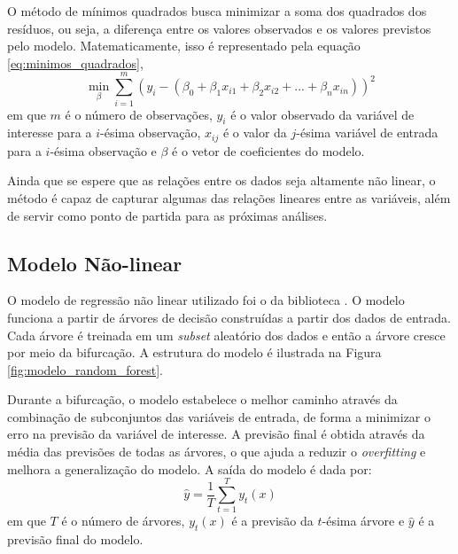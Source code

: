 O método de mínimos quadrados busca minimizar a soma dos quadrados dos resíduos, ou seja, a diferença entre os valores
observados e os valores previstos pelo modelo. Matematicamente, isso é representado pela equação \ref{eq:minimos_quadrados},
\begin{equation}
\label{eq:minimos_quadrados}
\min_{\beta} \sum_{i=1}^{m} \left(y_i - (\beta_0 + \beta_1 x_{i1} + \beta_2 x_{i2} + ... + \beta_n x_{in})\right)^2
\end{equation}
em que $m$ é o número de observações, $y_i$ é o valor observado da variável de interesse para a $i$-ésima observação,
$x_{ij}$ é o valor da $j$-ésima variável de entrada para a $i$-ésima observação e $\beta$ é o vetor de coeficientes
do modelo.

Ainda que se espere que as relações entre os dados seja altamente não linear, o método é capaz de capturar algumas
das relações lineares entre as variáveis, além de servir como ponto de partida para as próximas análises.


\subsection{Modelo Não-linear}
O modelo de regressão não linear utilizado foi o  da biblioteca . O modelo 
funciona a partir de árvores de decisão construídas a partir dos dados de entrada. Cada árvore é treinada em um \textit{subset}
aleatório dos dados e então a árvore cresce por meio da bifurcação. A estrutura do modelo é ilustrada na Figura
\ref{fig:modelo_random_forest}.

\begin{figure}[!ht]
	{}
	{}
\end{figure}
Durante a bifurcação, o modelo estabelece o melhor caminho através da combinação de subconjuntos das variáveis de entrada, 
de forma a minimizar o erro na previsão da variável de interesse. A previsão final é obtida através da média das previsões 
de todas as árvores, o que ajuda a reduzir o \textit{overfitting} e melhora a generalização do modelo. A saída do modelo
é dada por:
\begin{equation}
\label{eq:regressao_random_forest}
\hat{y} = \frac{1}{T} \sum_{t=1}^{T} y_t(x)
\end{equation}
em que $T$ é o número de árvores, $y_t(x)$ é a previsão da $t$-ésima árvore e $\hat{y}$ é a previsão final do modelo.


